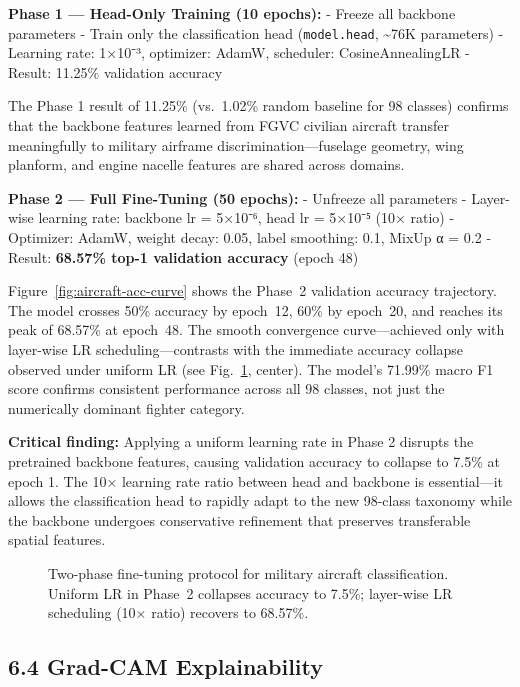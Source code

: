 \documentclass[11pt,a4paper]{article}
\begin{document}
\textbf{Phase 1 --- Head-Only Training (10 epochs):}
- Freeze all backbone parameters
- Train only the classification head (\texttt{model.head}, \textasciitilde76K parameters)
- Learning rate: 1×10⁻³, optimizer: AdamW, scheduler: CosineAnnealingLR
- Result: 11.25\% validation accuracy

The Phase 1 result of 11.25\% (vs.~1.02\% random baseline for 98 classes) confirms that the backbone features learned from FGVC civilian aircraft transfer meaningfully to military airframe discrimination---fuselage geometry, wing planform, and engine nacelle features are shared across domains.

\textbf{Phase 2 --- Full Fine-Tuning (50 epochs):}
- Unfreeze all parameters
- Layer-wise learning rate: backbone lr = 5×10⁻⁶, head lr = 5×10⁻⁵ (10× ratio)
- Optimizer: AdamW, weight decay: 0.05, label smoothing: 0.1, MixUp α = 0.2
- Result: \textbf{68.57\% top-1 validation accuracy} (epoch 48)

Figure~\ref{fig:aircraft-acc-curve} shows the Phase~2 validation accuracy trajectory. The model crosses 50\% accuracy by epoch~12, 60\% by epoch~20, and reaches its peak of 68.57\% at epoch~48. The smooth convergence curve---achieved only with layer-wise LR scheduling---contrasts with the immediate accuracy collapse observed under uniform LR (see Fig.~\ref{fig:finetune}, center). The model's 71.99\% macro F1 score confirms consistent performance across all 98 classes, not just the numerically dominant fighter category.

\textbf{Critical finding:} Applying a uniform learning rate in Phase 2 disrupts the pretrained backbone features, causing validation accuracy to collapse to 7.5\% at epoch 1. The 10× learning rate ratio between head and backbone is essential---it allows the classification head to rapidly adapt to the new 98-class taxonomy while the backbone undergoes conservative refinement that preserves transferable spatial features.

\begin{figure}[t]
\centering
\resizebox{\textwidth}{!}{}
\caption{Two-phase fine-tuning protocol for military aircraft classification. Uniform LR in Phase~2 collapses accuracy to 7.5\%; layer-wise LR scheduling (10$\times$ ratio) recovers to 68.57\%.}
\label{fig:finetune}
\end{figure}

\hypertarget{grad-cam-explainability}{%
\subsection{6.4 Grad-CAM Explainability}\label{grad-cam-explainability}}
\end{document}
